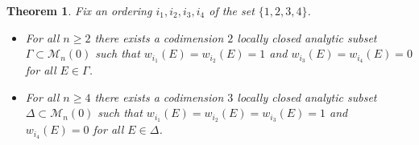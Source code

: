 \documentclass[10pt,a4paper]{amsart}
\theoremstyle{plain}
\newtheorem{theorem}{Theorem}
\theoremstyle{definition}
\theoremstyle{remark}
\begin{document}
\begin{theorem}\label{Wrr7}
Fix an ordering $i_1,i_2,i_3,i_4$ of the set $\{1,2,3,4\}$.
\begin{itemize}
\item[(a)] For all $n\ge 2$ there exists  a codimension $2$ locally closed analytic subset $\Gamma \subset \mathcal M_n(0)$ such that $w_{i_1}(E)=w_{i_2}(E)=1$ and $w_{i_3}(E)=w_{i_4}(E)=0$ for all $E\in \Gamma$.

\item[(b)] For all $n\ge 4$ there exists  a codimension $3$ locally closed analytic subset $\Delta \subset \mathcal M_n(0)$ such that $w_{i_1}(E)=w_{i_2}(E)=w_{i_3}(E)=1$ and $w_{i_4}(E)=0$ for all $E\in \Delta$.
\end{itemize}
\end{theorem}
\end{document}
